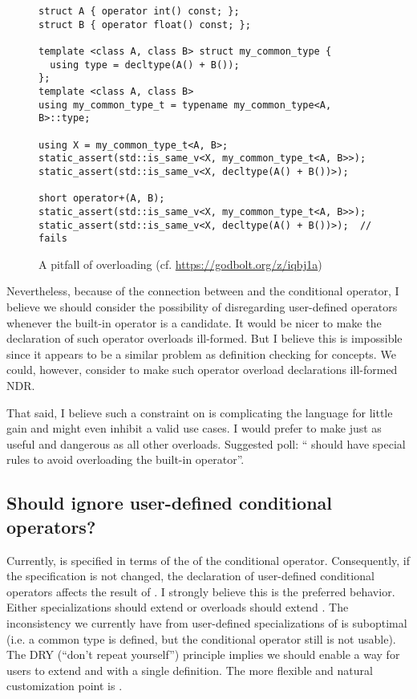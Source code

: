 \begin{figure}[bht]
  \begin{lstlisting}[style=Vc]
struct A { operator int() const; };
struct B { operator float() const; };

template <class A, class B> struct my_common_type {
  using type = decltype(A() + B());
};
template <class A, class B>
using my_common_type_t = typename my_common_type<A, B>::type;

using X = my_common_type_t<A, B>;
static_assert(std::is_same_v<X, my_common_type_t<A, B>>);
static_assert(std::is_same_v<X, decltype(A() + B())>);

short operator+(A, B);
static_assert(std::is_same_v<X, my_common_type_t<A, B>>);
static_assert(std::is_same_v<X, decltype(A() + B())>);  // fails
  \end{lstlisting}
  \caption{A pitfall of overloading (cf. \url{https://godbolt.org/z/iqbj1a})}
  \label{fig:operator+}
\end{figure}

Nevertheless, because of the connection between  and the conditional operator, I believe we should consider the possibility of disregarding user-defined operators whenever the built-in operator is a candidate.
It would be nicer to make the declaration of such operator overloads ill-formed.
But I believe this is impossible since it appears to be a similar problem as definition checking for concepts.
We could, however, consider to make such operator overload declarations ill-formed NDR.

That said, I believe such a constraint on  is complicating the language for little gain and might even inhibit a valid use cases.
I would prefer to make  just as useful and dangerous as all other overloads.
Suggested poll: “ should have special rules to avoid overloading the built-in operator”.

\subsection{Should  ignore user-defined conditional operators?}
Currently,  is specified in terms of the  of the conditional operator.
Consequently, if the  specification is not changed, the declaration of user-defined conditional operators affects the result of .
I strongly believe this is the preferred behavior.
Either  specializations should extend  or  overloads should extend .
The inconsistency we currently have from user-defined specializations of  is suboptimal (i.e. a common type is defined, but the conditional operator still is not usable).
The DRY (“don't repeat yourself”) principle implies we should enable a way for users to extend  and  with a single definition.
The more flexible and natural customization point is .

